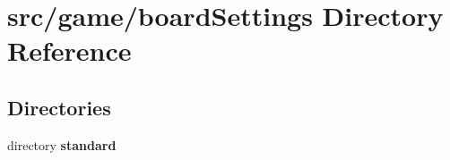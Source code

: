 \section{src/game/board\-Settings Directory Reference}
\label{dir_2af89fabecde52216b93cc217088679e}
\subsection*{Directories}
\begin{DoxyCompactItemize}
\item 
directory {\bf standard}
\end{DoxyCompactItemize}
